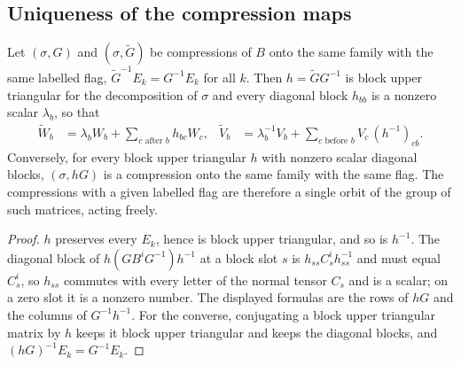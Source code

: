 \subsection{Uniqueness of the compression maps}

\begin{lemma}
    \label{thm:asym_uniq_same_flag}
    \leanok
    Let $(\sigma,G)$ and $(\sigma,\widetilde G)$ be compressions of $B$ onto the same family with the
    same labelled flag, $\widetilde G^{-1}E_k=G^{-1}E_k$ for all $k$. Then $h=\widetilde GG^{-1}$ is
    block upper triangular for the decomposition of $\sigma$ and every diagonal block $h_{bb}$ is a
    nonzero scalar $\lambda_b$, so that
    \begin{align}
        \widetilde W_b & =\lambda_bW_b+\sum_{c\text{ after }b}h_{bc}W_c,                &
        \widetilde V_b & =\lambda_b^{-1}V_b+\sum_{c\text{ before }b}V_c\,(h^{-1})_{cb}.
    \end{align}
    Conversely, for every block upper triangular $h$ with nonzero scalar diagonal blocks,
    $(\sigma,hG)$ is a compression onto the same family with the same flag. The compressions with a
    given labelled flag are therefore a single orbit of the group of such matrices, acting freely.
\end{lemma}

\begin{proof}
    \leanok
    $h$ preserves every $E_k$, hence is block upper triangular, and so is $h^{-1}$. The diagonal
    block of $h(GB^iG^{-1})h^{-1}$ at a block slot $s$ is $h_{ss}C_s^ih_{ss}^{-1}$ and must equal
    $C_s^i$, so $h_{ss}$ commutes with every letter of the normal tensor $C_s$ and is a scalar; on a
    zero slot it is a nonzero number. The displayed formulas are the rows of $hG$ and the columns of
    $G^{-1}h^{-1}$. For the converse, conjugating a block upper triangular matrix by $h$ keeps it
    block upper triangular and keeps the diagonal blocks, and $(hG)^{-1}E_k=G^{-1}E_k$.
\end{proof}

